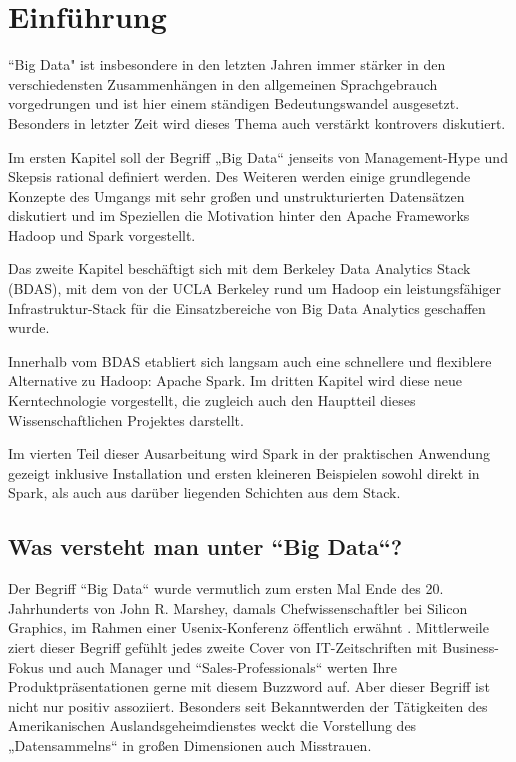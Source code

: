 \chapter{Einführung}
\label{chapter:einfuehrung}

``Big Data" ist insbesondere in den letzten Jahren immer stärker in den verschiedensten Zusammenhängen in den allgemeinen Sprachgebrauch vorgedrungen und ist hier einem ständigen Bedeutungswandel ausgesetzt. Besonders in letzter Zeit wird dieses Thema auch verstärkt kontrovers diskutiert.  

Im ersten Kapitel soll der Begriff „Big Data“ jenseits von Management-Hype und Skepsis rational definiert werden. Des Weiteren werden einige grundlegende Konzepte des Umgangs mit sehr großen und unstrukturierten Datensätzen diskutiert und im Speziellen die Motivation hinter den Apache Frameworks Hadoop und Spark vorgestellt.  

Das zweite Kapitel beschäftigt sich mit dem Berkeley Data Analytics Stack (BDAS), mit dem von der UCLA Berkeley rund um Hadoop ein leistungsfähiger Infrastruktur-Stack für die Einsatzbereiche von Big Data Analytics geschaffen wurde. 

Innerhalb vom BDAS etabliert sich langsam auch eine schnellere und flexiblere Alternative zu Hadoop: Apache Spark. Im dritten Kapitel wird diese neue Kerntechnologie vorgestellt, die zugleich auch den Hauptteil dieses Wissenschaftlichen Projektes darstellt. 

Im vierten Teil dieser Ausarbeitung wird Spark in der praktischen Anwendung gezeigt inklusive Installation und ersten kleineren Beispielen sowohl direkt in Spark, als auch aus darüber liegenden Schichten aus dem Stack. 

\section{Was versteht man unter ``Big Data“?}
\label{section:was versteht man unter ``Big Data”?}


Der Begriff ``Big Data“ wurde vermutlich zum ersten Mal Ende des 20. Jahrhunderts von John R. Marshey, damals Chefwissenschaftler bei Silicon Graphics, im Rahmen einer Usenix-Konferenz öffentlich erwähnt . Mittlerweile ziert dieser Begriff gefühlt jedes zweite Cover von IT-Zeitschriften mit Business-Fokus und auch Manager und ``Sales-Professionals“ werten Ihre Produktpräsentationen gerne mit diesem Buzzword auf.  Aber dieser Begriff ist nicht nur positiv assoziiert. Besonders seit Bekanntwerden der Tätigkeiten des Amerikanischen Auslandsgeheimdienstes weckt die Vorstellung des „Datensammelns“ in großen Dimensionen auch Misstrauen. 

